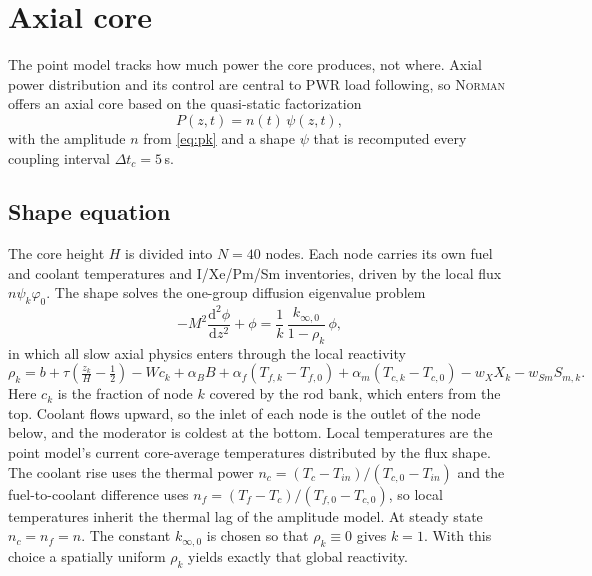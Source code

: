 \documentclass[11pt,a4paper]{article}
\newcommand{\dd}{\mathrm{d}}
\newcommand{\Norman}{\textsc{Norman}}
\begin{document}
\section{Axial core}\label{sec:axial}

The point model tracks how much power the core produces, not where. Axial power
distribution and its control are central to PWR load following, so \Norman{} offers
an axial core based on the quasi-static factorization~\cite{ott1966}
\begin{equation}
  P(z,t) = n(t)\,\psi(z,t),
\end{equation}
with the amplitude $n$ from \cref{eq:pk} and a shape $\psi$ that is recomputed every
coupling interval $\Delta t_c = 5$\,s.

\subsection{Shape equation}

The core height $H$ is divided into $N=40$ nodes. Each node carries its own fuel and
coolant temperatures and I/Xe/Pm/Sm inventories, driven by the local flux
$n\psi_k\varphi_0$. The shape solves the one-group diffusion eigenvalue problem
\begin{equation}
  -M^2 \frac{\dd^2 \phi}{\dd z^2} + \phi = \frac{1}{k}\,\frac{k_{\infty,0}}{1 - \rho_k}\,\phi,
  \label{eq:diffusion}
\end{equation}
in which all slow axial physics enters through the local reactivity
\begin{equation}
  \rho_k = b + \tau\left(\tfrac{z_k}{H} - \tfrac12\right) - W c_k + \alpha_B B
  + \alpha_f (T_{f,k} - T_{f,0}) + \alpha_m (T_{c,k} - T_{c,0}) - w_X X_k - w_{Sm} S_{m,k}.
\end{equation}
Here $c_k$ is the fraction of node $k$ covered by the rod bank, which enters from the
top. Coolant flows upward, so the inlet of each node is the outlet of the node below,
and the moderator is coldest at the bottom. Local temperatures are the point model's
current core-average temperatures distributed by the flux shape. The coolant rise
uses the thermal power $n_c = (T_c - T_{in})/(T_{c,0} - T_{in})$ and the fuel-to-coolant
difference uses $n_f = (T_f - T_c)/(T_{f,0} - T_{c,0})$, so local temperatures inherit
the thermal lag of the amplitude model. At steady state $n_c = n_f = n$. The constant $k_{\infty,0}$ is
chosen so that $\rho_k\equiv 0$ gives $k = 1$. With this choice a spatially uniform
$\rho_k$ yields exactly that global reactivity.
\end{document}
